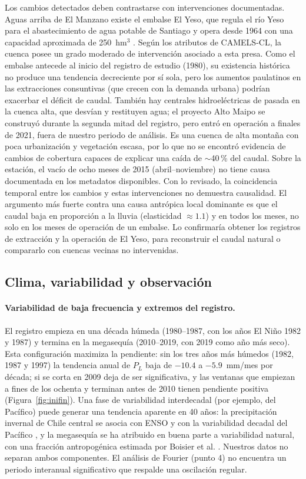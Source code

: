 \documentclass[11pt,letterpaper]{article}
\begin{document}
Los cambios detectados deben contrastarse con intervenciones documentadas. Aguas arriba de El Manzano existe
el embalse El Yeso, que regula el río Yeso para el abastecimiento de agua potable de Santiago y opera desde
1964 con una capacidad aproximada de 250~hm$^3$ \citep{AlvarezGarreton2018}. Según los atributos de CAMELS-CL,
la cuenca posee un grado moderado de intervención asociado a esta presa. 
Como el embalse antecede al inicio del registro de estudio (1980), su existencia histórica no produce una tendencia decreciente por sí sola, pero los aumentos paulatinos en las extracciones consuntivas (que crecen con la demanda urbana) podrían exacerbar el déficit de caudal. También hay centrales hidroeléctricas de pasada en la cuenca alta, que
desvían y restituyen agua; el proyecto Alto Maipo se construyó durante la segunda mitad del registro, pero entró
en operación a finales de 2021, fuera de nuestro periodo de análisis. 
Es una cuenca de alta montaña con poca urbanización y vegetación escasa, por lo que no se encontró evidencia de
cambios de cobertura capaces de explicar una caída de $\sim$40\,\% del caudal. Sobre la estación, el vacío de ocho
meses de 2015 (abril--noviembre) no tiene causa documentada en los metadatos disponibles. Con lo revisado, la
coincidencia temporal entre los cambios y estas intervenciones no demuestra causalidad. El argumento más
fuerte contra una causa antrópica local dominante es que el caudal baja en proporción a la lluvia
(elasticidad $\approx1.1$) y en todos los meses, no solo en los meses de operación de un embalse. Lo
confirmaría obtener los registros de extracción y la operación de El Yeso, para reconstruir el caudal natural
o compararlo con cuencas vecinas no intervenidas.

\subsection{Clima, variabilidad y observación}
\label{sec:obs}

\paragraph{Variabilidad de baja frecuencia y extremos del registro.} El registro empieza en una década húmeda
(1980--1987, con los años El Niño 1982 y 1987) y termina en la megasequía (2010--2019, con 2019 como año más
seco). Esta configuración maximiza la pendiente: sin los tres años más húmedos (1982, 1987 y 1997) la tendencia
anual de $P_L$ baja de $-10.4$ a $-5.9$~mm/mes por década; si se corta en 2009 deja de ser significativa, y las
ventanas que empiezan a fines de los ochenta y terminan antes de 2010 tienen pendiente positiva
(Figura~\ref{fig:inifin}). Una fase de variabilidad interdecadal (por ejemplo, del Pacífico) puede generar una
tendencia aparente en 40 años: la precipitación invernal de Chile central se asocia con ENSO
\citep{Montecinos2003} y con la variabilidad decadal del Pacífico \citep{Garreaud2009}, y la megasequía se ha
atribuido en buena parte a variabilidad natural, con una fracción antropogénica estimada por Boisier et al. \citep{Boisier2016}.
Nuestros datos no separan ambos componentes. El análisis de Fourier (punto 4) no encuentra un periodo
interanual significativo que respalde una oscilación regular.
\end{document}
